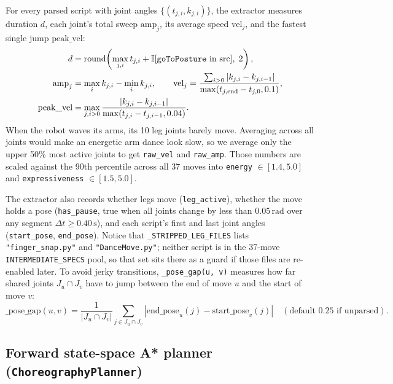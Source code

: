 \documentclass[11pt,a4paper]{article}
\newcommand{\code}[1]{\texttt{#1}}
\begin{document}
For every parsed script with joint angles $\{(t_{j,i}, k_{j,i})\}$, the extractor measures duration $d$, each joint's total sweep $\text{amp}_j$, its average speed $\text{vel}_j$, and the fastest single jump $\text{peak\_vel}$:
\begin{align*}
  d &= \operatorname{round}\!\left(\max_{j,i} t_{j,i} + \mathbb{I}[\text{\code{goToPosture} in src}],\; 2\right), \\
  \text{amp}_j &= \max_i k_{j,i} - \min_i k_{j,i}, \qquad
  \text{vel}_j = \frac{\sum_{i>0}|k_{j,i}-k_{j,i-1}|}{\max(t_{j,\text{end}}-t_{j,0}, 0.1)}, \\
  \text{peak\_vel} &= \max_{j, i>0} \frac{|k_{j,i}-k_{j,i-1}|}{\max(t_{j,i}-t_{j,i-1}, 0.04)}.
\end{align*}
When the robot waves its arms, its 10 leg joints barely move. Averaging across all joints would make an energetic arm dance look slow, so we average only the upper 50\% most active joints to get \code{raw\_vel} and \code{raw\_amp}. Those numbers are scaled against the 90th percentile across all 37 moves into \code{energy} $\in [1.4, 5.0]$ and \code{expressiveness} $\in [1.5, 5.0]$.

The extractor also records whether legs move (\code{leg\_active}), whether the move holds a pose (\code{has\_pause}, true when all joints change by less than $0.05\,\text{rad}$ over any segment $\Delta t \ge 0.40\,\text{s}$), and each script's first and last joint angles (\code{start\_pose}, \code{end\_pose}). Notice that \code{\_STRIPPED\_LEG\_FILES} lists \code{"finger\_snap.py"} and \code{"DanceMove.py"}; neither script is in the 37-move \code{INTERMEDIATE\_SPECS} pool, so that set sits there as a guard if those files are re-enabled later. To avoid jerky transitions, \code{\_pose\_gap(u, v)} measures how far shared joints $J_u \cap J_v$ have to jump between the end of move $u$ and the start of move $v$:
\[
  \text{\_pose\_gap}(u, v) = \frac{1}{|J_u \cap J_v|} \sum_{j \in J_u \cap J_v} |\text{end\_pose}_u(j) - \text{start\_pose}_v(j)| \quad (\text{default } 0.25\text{ if unparsed}).
\]

\subsection{Forward state-space A* planner (\texorpdfstring{\code{ChoreographyPlanner}}{ChoreographyPlanner})}
\end{document}
